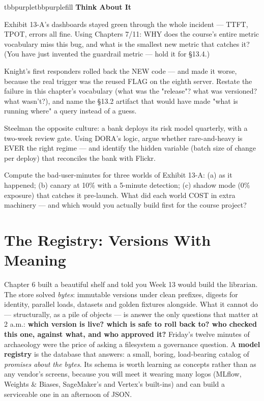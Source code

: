 \begin{calloutbox}{tbbpurple}{tbbpurplefill}
{\normalsize\bfseries\color{tbbpurple}Think About It}\par\vspace{3pt}
\begin{tbbitemize}
  \item Exhibit 13-A's dashboards stayed green through the whole incident — TTFT, TPOT, errors all fine. Using Chapters 7/11: WHY does the course's entire metric vocabulary miss this bug, and what is the smallest new metric that catches it? (You have just invented the guardrail metric — hold it for §13.4.)
  \item Knight's first responders rolled back the NEW code — and made it worse, because the real trigger was the reused FLAG on the eighth server. Restate the failure in this chapter's vocabulary (what was the "release"? what was versioned? what wasn't?), and name the §13.2 artifact that would have made "what is running where" a query instead of a guess.
  \item Steelman the opposite culture: a bank deploys its risk model quarterly, with a two-week review gate. Using DORA's logic, argue whether rare-and-heavy is EVER the right regime — and identify the hidden variable (batch size of change per deploy) that reconciles the bank with Flickr.
  \item Compute the bad-user-minutes for three worlds of Exhibit 13-A: (a) as it happened; (b) canary at 10\% with a 5-minute detection; (c) shadow mode (0\% exposure) that catches it pre-launch. What did each world COST in extra machinery — and which would you actually build first for the course project?
\end{tbbitemize}
\end{calloutbox}

\section{The Registry: Versions With Meaning}

Chapter 6 built a beautiful shelf and told you Week 13 would build the librarian. The store solved \textit{bytes}: immutable versions under clean prefixes, digests for identity, parallel loads, datasets and golden fixtures alongside. What it cannot do — structurally, as a pile of objects — is answer the only questions that matter at 2 a.m.: \textbf{which version is live? which is safe to roll back to? who checked this one, against what, and who approved it?} Friday's twelve minutes of archaeology were the price of asking a filesystem a governance question. A \textbf{model registry} is the database that answers: a small, boring, load-bearing catalog of \textit{promises about the bytes}. Its schema is worth learning as concepts rather than as any vendor's screens, because you will meet it wearing many logos (MLflow, Weights \& Biases, SageMaker's and Vertex's built-ins) and can build a serviceable one in an afternoon of JSON.

